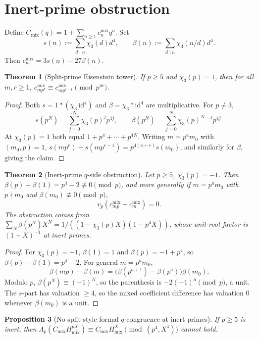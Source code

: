 \documentclass[11pt]{amsart}
\newtheorem{theorem}{Theorem}[section]
\newtheorem{proposition}[theorem]{Proposition}
\theoremstyle{definition}
\theoremstyle{remark}
\newcommand{\vp}{v_p}
\begin{document}
\section{Inert-prime obstruction}\label{sec:inert}

Define $C_{\mathrm{mix}}(q)=1+\sum_{n\ge 1}c_n^{\mathrm{mix}}q^n$. Set
\[
s(n):=\sum_{d\mid n}\chi_3(d)d^4,\qquad\beta(n):=\sum_{d\mid n}\chi_3(n/d)d^4.
\]
Then $c_n^{\mathrm{mix}}=3s(n)-27\beta(n)$.

\begin{theorem}[Split-prime Eisenstein tower]\label{thm:split-tower}
If $p\ge 5$ and $\chi_3(p)=1$, then for all $m,r\ge 1$, $c_{mp^r}^{\mathrm{mix}}\equiv c_{mp^{r-1}}^{\mathrm{mix}}\pmod{p^{4r}}$.
\end{theorem}

\begin{proof}
Both $s=1*(\chi_3\,\mathrm{id}^4)$ and $\beta=\chi_3*\mathrm{id}^4$ are multiplicative. For $p\ne 3$,
\[
s(p^N)=\sum_{j=0}^N\chi_3(p)^jp^{4j},\qquad\beta(p^N)=\sum_{j=0}^N\chi_3(p)^{N-j}p^{4j}.
\]
At $\chi_3(p)=1$ both equal $1+p^4+\cdots+p^{4N}$. Writing $m=p^am_0$ with $(m_0,p)=1$,
$s(mp^r)-s(mp^{r-1})=p^{4(a+r)}s(m_0)$, and similarly for $\beta$, giving the claim.
\end{proof}

\begin{theorem}[Inert-prime $q$-side obstruction]\label{thm:inert-obstruction}
Let $p\ge 5$, $\chi_3(p)=-1$. Then $\beta(p)-\beta(1)=p^4-2\not\equiv 0\pmod p$, and more generally if $m=p^am_0$ with $p\nmid m_0$ and $\beta(m_0)\not\equiv 0\pmod p$,
\[
\vp(c_{mp}^{\mathrm{mix}}-c_m^{\mathrm{mix}})=0.
\]
The obstruction comes from $\sum_N\beta(p^N)X^N=1/((1-\chi_3(p)X)(1-p^4X))$, whose unit-root factor is $(1+X)^{-1}$ at inert primes.
\end{theorem}

\begin{proof}
For $\chi_3(p)=-1$, $\beta(1)=1$ and $\beta(p)=-1+p^4$, so $\beta(p)-\beta(1)=p^4-2$. For general $m=p^am_0$,
\[
\beta(mp)-\beta(m)=\bigl(\beta(p^{a+1})-\beta(p^a)\bigr)\beta(m_0).
\]
Modulo $p$, $\beta(p^N)\equiv(-1)^N$, so the parenthesis is $-2(-1)^a\pmod p$, a unit. The $s$-part has valuation $\ge 4$, so the mixed coefficient difference has valuation $0$ whenever $\beta(m_0)$ is a unit.
\end{proof}

\begin{proposition}[No split-style formal $q$-congruence at inert primes]\label{prop:no-inert-dwork}
If $p\ge 5$ is inert, then $\Lambda_p(C_{\mathrm{mix}}H_{\mathrm{mix}}^{pX})\equiv C_{\mathrm{mix}}H_{\mathrm{mix}}^X\pmod{(p^4,X^4)}$ cannot hold.
\end{proposition}
\end{document}
